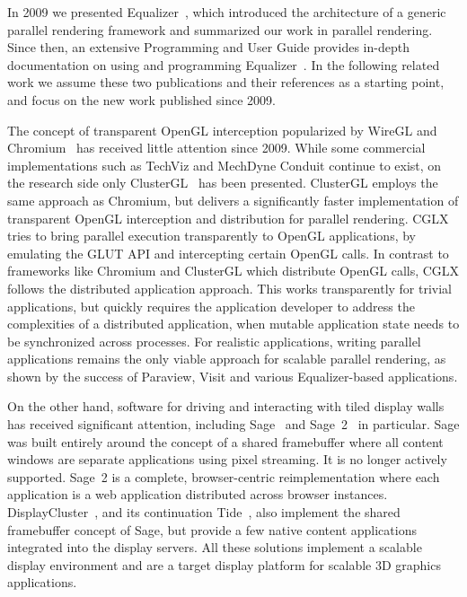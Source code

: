 \documentclass[10pt,journal,compsoc]{IEEEtran}
\begin{document}
In 2009 we presented \textsf{Equalizer}~\cite{EMP:09}, which introduced the
architecture of a generic parallel rendering framework and summarized our work
in parallel rendering. Since then, an extensive Programming and User Guide
provides in-depth documentation on using and programming
\textsf{Equalizer}~\cite{Eilemann:13}. In the following related work we assume
these two publications and their references as a starting point, and focus on
the new work published since 2009.

The concept of transparent OpenGL interception popularized by \textsf{WireGL}
and \textsf{Chromium}~\cite{HHNFAKK:02} has received little attention since
2009. While some commercial implementations such as \textsf{TechViz} and
\textsf{MechDyne Conduit} continue to exist, on the research side only
\textsf{ClusterGL}~\cite{NHM:11} has been presented. \textsf{ClusterGL} employs
the same approach as \textsf{Chromium}, but delivers a significantly faster
implementation of transparent OpenGL interception and distribution for parallel
rendering. \textsf{CGLX}~\cite{DK:11} tries to bring parallel execution
transparently to OpenGL applications, by emulating the GLUT API and intercepting
certain OpenGL calls. In contrast to frameworks like \textsf{Chromium} and
\textsf{ClusterGL} which distribute OpenGL calls, \textsf{CGLX} follows the
distributed application approach. This works transparently for trivial
applications, but quickly requires the application developer to address the
complexities of a distributed application, when mutable application state needs
to be synchronized across processes. For realistic applications, writing
parallel applications remains the only viable approach for scalable parallel
rendering, as shown by the success of \textsf{Paraview}, \textsf{Visit} and
various \textsf{Equalizer}-based applications.

On the other hand, software for driving and interacting with tiled display walls
has received significant attention, including \textsf{Sage}~\cite{Sage} and
\textsf{Sage~2}~\cite{Sage2} in particular. \textsf{Sage} was built entirely
around the concept of a shared framebuffer where all content windows are
separate applications using pixel streaming. It is no longer actively supported.
\textsf{Sage~2} is a complete, browser-centric reimplementation where each
application is a web application distributed across browser instances.
\textsf{DisplayCluster}~\cite{DC}, and its continuation
\textsf{Tide}~\cite{tide}, also implement the shared framebuffer concept of
\textsf{Sage}, but provide a few native content applications integrated into the
display servers. All these solutions implement a scalable display environment and
are a target display platform for scalable 3D graphics applications.
\end{document}
